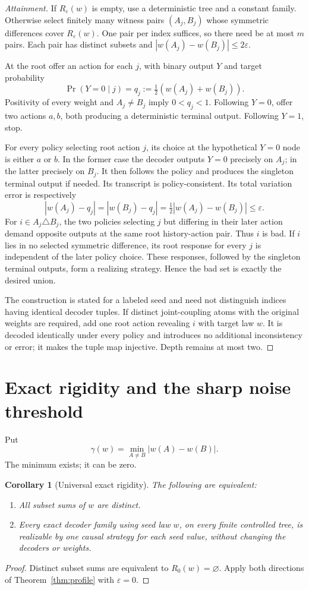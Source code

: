 \documentclass[11pt]{article}
\newtheorem{corollary}[theorem]{Corollary}
\begin{document}
\begin{proof}[Attainment]
If $R_\varepsilon(w)$ is empty, use a deterministic tree and a constant family. Otherwise select finitely many witness pairs $(A_j,B_j)$ whose symmetric differences cover $R_\varepsilon(w)$. One pair per index suffices, so there need be at most $m$ pairs. Each pair has distinct subsets and $|w(A_j)-w(B_j)|\le2\varepsilon$.

At the root offer an action for each $j$, with binary output $Y$ and target probability
\[
 \Pr(Y=0\mid j)=q_j:=\tfrac12(w(A_j)+w(B_j)).
\]
Positivity of every weight and $A_j\ne B_j$ imply $0<q_j<1$. Following $Y=0$, offer two actions $a,b$, both producing a deterministic terminal output. Following $Y=1$, stop.

For every policy selecting root action $j$, its choice at the hypothetical $Y=0$ node is either $a$ or $b$. In the former case the decoder outputs $Y=0$ precisely on $A_j$; in the latter precisely on $B_j$. It then follows the policy and produces the singleton terminal output if needed. Its transcript is policy-consistent. Its total variation error is respectively
\[
 |w(A_j)-q_j|=|w(B_j)-q_j|
 =\tfrac12|w(A_j)-w(B_j)|\le\varepsilon.
\]
For $i\in A_j\triangle B_j$, the two policies selecting $j$ but differing in their later action demand opposite outputs at the same root history-action pair. Thus $i$ is bad. If $i$ lies in no selected symmetric difference, its root response for every $j$ is independent of the later policy choice. These responses, followed by the singleton terminal outputs, form a realizing strategy. Hence the bad set is exactly the desired union.

The construction is stated for a labeled seed and need not distinguish indices having identical decoder tuples. If distinct joint-coupling atoms with the original weights are required, add one root action revealing $i$ with target law $w$. It is decoded identically under every policy and introduces no additional inconsistency or error; it makes the tuple map injective. Depth remains at most two.
\end{proof}

\section{Exact rigidity and the sharp noise threshold}
Put
\[
 \gamma(w)=\min_{A\ne B}|w(A)-w(B)|.
\]
The minimum exists; it can be zero.
\begin{corollary}[Universal exact rigidity]
The following are equivalent:
\begin{enumerate}
\item All subset sums of $w$ are distinct.
\item Every exact decoder family using seed law $w$, on every finite controlled tree, is realizable by one causal strategy for each seed value, without changing the decoders or weights.
\end{enumerate}
\end{corollary}
\begin{proof}
Distinct subset sums are equivalent to $R_0(w)=\varnothing$. Apply both directions of Theorem~\ref{thm:profile} with $\varepsilon=0$.
\end{proof}
\end{document}
